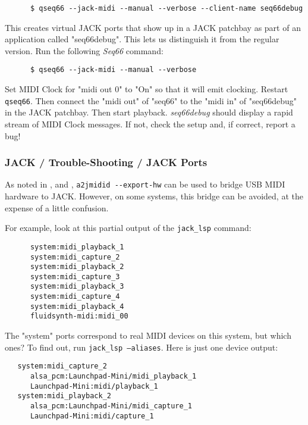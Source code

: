    \begin{verbatim}
      $ qseq66 --jack-midi --manual --verbose --client-name seq66debug
   \end{verbatim}

   This creates virtual JACK ports that show up in a JACK patchbay as part of
   an application called "seq66debug".  This lets us distinguish it from
   the regular version.  Run the following \textsl{Seq66} command:

   \begin{verbatim}
      $ qseq66 --jack-midi --manual --verbose
   \end{verbatim}

   Set MIDI Clock for "midi out 0" to "On" so that it will emit clocking.
   Restart \texttt{qseq66}.
   Then connect the "midi out" of "seq66" to the "midi in" of "seq66debug"
   in the JACK patchbay.
   Then start playback.
   \textsl{seq66debug} should display a rapid stream of MIDI Clock messages.
   If not, check the setup and, if correct, report a bug!

\subsubsection{JACK / Trouble-Shooting / JACK Ports}
\label{subsubsec:jack_testing_midi_clock}

   As noted in
   , and
   ,
   \texttt{a2jmidid -{}-export-hw} can be used to bridge USB MIDI
   hardware to JACK.  However, on some systems, this bridge can be
   avoided, at the expense of a little confusion.

   For example, look at this partial output of the \texttt{jack\_lsp}
   command:

   \begin{verbatim}
      system:midi_playback_1
      system:midi_capture_2
      system:midi_playback_2
      system:midi_capture_3
      system:midi_playback_3
      system:midi_capture_4
      system:midi_playback_4
      fluidsynth-midi:midi_00
   \end{verbatim}

   The "system" ports correspond to real MIDI devices on this system, but which
   ones?  To find out, run \texttt{jack\_lsp --aliases}.  Here is just one
   device output:

   \begin{verbatim}
   system:midi_capture_2
      alsa_pcm:Launchpad-Mini/midi_playback_1
      Launchpad-Mini:midi/playback_1
   system:midi_playback_2
      alsa_pcm:Launchpad-Mini/midi_capture_1
      Launchpad-Mini:midi/capture_1
   \end{verbatim}

